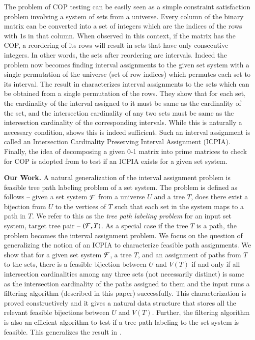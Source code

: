 \documentclass[MS]             %
              {iitmdiss}
\begin{document}
The problem of COP testing can be easily seen as a simple constraint
satisfaction problem involving a system of sets from a universe. Every
column of the binary matrix can be converted into a set of integers
which are the indices of the rows with $1$s in that column. When
observed in this context, if the matrix has the COP, a reordering of
its rows will result in sets that have only consecutive integers. In
other words, the sets after reordering are intervals. Indeed the
problem now becomes finding interval assignments to the given set
system \cite{nsnrs09} with a single permutation of the universe (set
of row indices) which permutes each set to its interval. The result in
\cite{nsnrs09} characterizes interval assignments to the sets which
can be obtained from a single permutation of the rows.  They show that
for each set, the cardinality of the interval assigned to it must be
same as the cardinality of the set, and the intersection cardinality
of any two sets must be same as the interesction cardinality of the
corresponding intervals.  While this is naturally a necessary
condition, \cite{nsnrs09} shows this is indeed sufficient.  Such an
interval assignment is called an Intersection Cardinality Preserving
Interval Assignment (ICPIA).  Finally, the idea of decomposing a given
0-1 matrix into prime matrices to check for COP is adopted from
\cite{wlh02} to test if an ICPIA exists for a given set system.

\noindent 
{\bf Our Work.}  A natural generalization of the interval
assignment problem is feasible tree path labeling problem of a set
system. The problem is defined as follows -- given a set system ${\cal F}$
from a universe $U$ and a tree $T$, does there exist a bijection from
$U$ to the vertices of $T$ such that each set in the system maps to a
path in $T$.  We refer to this as the {\em tree path labeling problem}
for an input set system, target tree pair -- $({\cal F},T)$. As a special
case if the tree $T$ is a path, the problem becomes the interval
assignment problem.  We focus on the question of generalizing the
notion of an ICPIA \cite{nsnrs09} to characterize feasible path
assignments.  We show that for a given set system ${\cal F}$, a tree $T$,
and an assignment of paths from $T$ to the sets, there is a feasible
bijection between $U$ and $V(T)$ if and only if all intersection
cardinalities among any three sets (not necessarily distinct) is same
as the intersection cardinality of the paths assigned to them and the
input runs a filtering algorithm (described in this paper)
successfully.  This characterization is proved constructively and it
gives a natural data structure that stores all the relevant feasible
bijections between $U$ and $V(T)$.  Further, the filtering algorithm
is also an efficient algorithm to test if a tree path labeling to the
set system is feasible.  This generalizes the result in
\cite{nsnrs09}.
\end{document}
